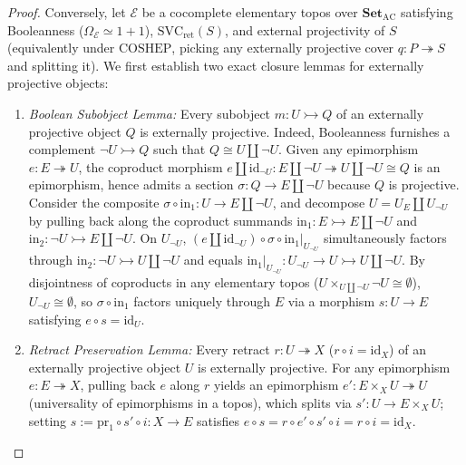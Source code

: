 \documentclass[10pt,twoside,openright]{book}
\theoremstyle{crmplain}
\theoremstyle{crmdef}
\theoremstyle{crmremark}
\begin{document}
\begin{proof}
Conversely, let $\mathcal{E}$ be a cocomplete elementary topos over $\mathbf{Set}_{\mathrm{AC}}$ satisfying Booleanness ($\Omega_{\mathcal{E}} \simeq 1+1$), $\mathrm{SVC}_{\mathrm{ret}}(S)$, and external projectivity of $S$ (equivalently under $\mathrm{COSHEP}$, picking any externally projective cover $q : P \twoheadrightarrow S$ and splitting it). We first establish two exact closure lemmas for externally projective objects:
\begin{enumerate}[label=(\alph*),leftmargin=1.8em]
  \item \emph{Boolean Subobject Lemma:} Every subobject $m : U \rightarrowtail Q$ of an externally projective object $Q$ is externally projective. Indeed, Booleanness furnishes a complement $\neg U \rightarrowtail Q$ such that $Q \cong U \amalg \neg U$. Given any epimorphism $e : E \twoheadrightarrow U$, the coproduct morphism $e \amalg \mathrm{id}_{\neg U} : E \amalg \neg U \twoheadrightarrow U \amalg \neg U \cong Q$ is an epimorphism, hence admits a section $\sigma : Q \to E \amalg \neg U$ because $Q$ is projective. Consider the composite $\sigma \circ \mathrm{in}_1 : U \to E \amalg \neg U$, and decompose $U = U_E \amalg U_{\neg U}$ by pulling back along the coproduct summands $\mathrm{in}_1 : E \rightarrowtail E \amalg \neg U$ and $\mathrm{in}_2 : \neg U \rightarrowtail E \amalg \neg U$. On $U_{\neg U}$, $(e \amalg \mathrm{id}_{\neg U}) \circ \sigma \circ \mathrm{in}_1|_{U_{\neg U}}$ simultaneously factors through $\mathrm{in}_2 : \neg U \rightarrowtail U \amalg \neg U$ and equals $\mathrm{in}_1|_{U_{\neg U}} : U_{\neg U} \to U \rightarrowtail U \amalg \neg U$. By disjointness of coproducts in any elementary topos ($U \times_{U \amalg \neg U} \neg U \cong \emptyset$), $U_{\neg U} \cong \emptyset$, so $\sigma \circ \mathrm{in}_1$ factors uniquely through $E$ via a morphism $s : U \to E$ satisfying $e \circ s = \mathrm{id}_U$.
  \item \emph{Retract Preservation Lemma:} Every retract $r : U \twoheadrightarrow X$ ($r \circ i = \mathrm{id}_X$) of an externally projective object $U$ is externally projective. For any epimorphism $e : E \twoheadrightarrow X$, pulling back $e$ along $r$ yields an epimorphism $e' : E \times_X U \twoheadrightarrow U$ (universality of epimorphisms in a topos), which splits via $s' : U \to E \times_X U$; setting $s := \mathrm{pr}_1 \circ s' \circ i : X \to E$ satisfies $e \circ s = r \circ e' \circ s' \circ i = r \circ i = \mathrm{id}_X$.
\end{enumerate}

\end{proof}
\end{document}
